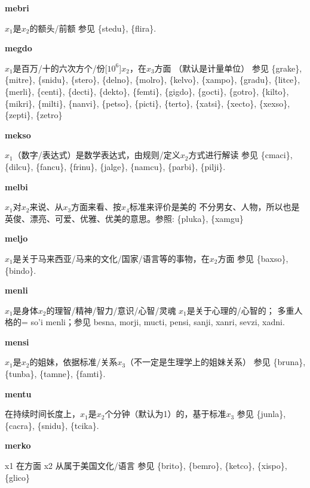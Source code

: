 \documentclass[notitlepage,twocolumn,a4paper,10pt]{book}
\begin{document}
{\sffamily\bfseries mebri}\enspace {\ttfamily\bfseries[meb]}  $x_1$是$x_2$的额头\slash{}前额 \textemdash{} 参见 \{stedu\}, \{flira\}.

{\sffamily\bfseries megdo}\enspace {\ttfamily\bfseries[meg]}  $x_1$是百万\slash{}十的六次方个\slash{}份[$10^{6}$]$x_2$，在$x_3$方面 （默认是计量单位） \textemdash{} 参见 \{grake\}, \{mitre\}, \{snidu\}, \{stero\}, \{delno\}, \{molro\}, \{kelvo\}, \{xampo\}, \{gradu\}, \{litce\}, \{merli\}, \{centi\}, \{decti\}, \{dekto\}, \{femti\}, \{gigdo\}, \{gocti\}, \{gotro\}, \{kilto\}, \{mikri\}, \{milti\}, \{nanvi\}, \{petso\}, \{picti\}, \{terto\}, \{xatsi\}, \{xecto\}, \{xexso\}, \{zepti\}, \{zetro\}

{\sffamily\bfseries mekso}\enspace {\ttfamily\bfseries[mek     me'o]}  $x_1$（数字\slash{}表达式）是数学表达式，由规则\slash{}定义$x_2$方式进行解读 \textemdash{} 参见 \{cmaci\}, \{dilcu\}, \{fancu\}, \{frinu\}, \{jalge\}, \{namcu\}, \{parbi\}, \{pilji\}.

{\sffamily\bfseries melbi}  $x_1$对$x_2$来说、从$x_3$方面来看、按$x_4$标准来评价是美的 \textemdash{} 不分男女、人物，所以也是英俊、漂亮、可爱、优雅、优美的意思。参照: \{pluka\}, \{xamgu\}

{\sffamily\bfseries meljo}\enspace {\ttfamily\bfseries[mej]}  $x_1$是关于马来西亚\slash{}马来的文化\slash{}国家\slash{}语言等的事物，在$x_2$方面 \textemdash{} 参见 \{baxso\}, \{bindo\}.

{\sffamily\bfseries menli}\enspace {\ttfamily\bfseries[men]}  $x_1$是身体$x_2$的理智\slash{}精神\slash{}智力\slash{}意识\slash{}心智\slash{}灵魂 \textemdash{} $x_1$是关于心理的\slash{}心智的； 多重人格的= so'i {menli}；参见 {besna}, {morji}, {mucti}, {pensi}, {sanji}, {xanri}, {sevzi}, {xadni}.

{\sffamily\bfseries mensi}\enspace {\ttfamily\bfseries[mes     me'i]}  $x_1$是$x_2$的姐妹，依据标准\slash{}关系$x_3$（不一定是生理学上的姐妹关系） \textemdash{} 参见 \{bruna\}, \{tunba\}, \{tamne\}, \{famti\}.

{\sffamily\bfseries mentu}\enspace {\ttfamily\bfseries[met     me'u]}  在持续时间长度上，$x_1$是$x_2$个分钟（默认为1）的，基于标准$x_3$ \textemdash{} 参见 \{junla\}, \{cacra\}, \{snidu\}, \{tcika\}.

{\sffamily\bfseries merko}\enspace {\ttfamily\bfseries[mer]}  x1 在方面 x2 从属于美国文化\slash{}语言 \textemdash{} 参见 \{brito\}, \{bemro\}, \{ketco\}, \{xispo\}, \{glico\}
\end{document}
